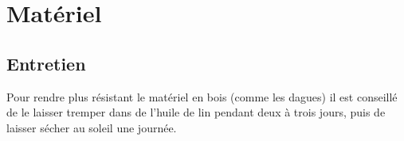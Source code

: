 \chapter{Matériel}



\section{Entretien}

Pour rendre plus résistant le matériel en bois (comme les dagues) il est conseillé de le laisser tremper dans de l'huile de lin pendant deux à trois jours, puis de laisser sécher au soleil une journée.

